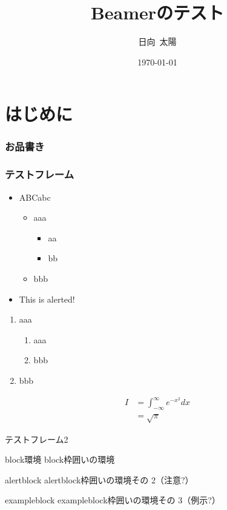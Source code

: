 \documentclass[unicode,11pt,t]{beamer}
\author{日向\ 太陽}
\title{Beamerのテスト}
\institute{日向大学}
\date{\today}
\begin{document}
	\begin{frame}[plain]
		\maketitle
	\end{frame}

	\section{はじめに}
	\begin{frame}
		\frametitle{お品書き}
		\tableofcontents
	\end{frame}

	\begin{frame}
		\frametitle{テストフレーム}
		\begin{itemize}
			\item ABCabc
			\begin{itemize}
				\item aaa
				\begin{itemize}
					\item aa
					\item bb
				\end{itemize}
				\item bbb
			\end{itemize}
			\item \alert{This is alerted!}
		\end{itemize}
		\begin{enumerate}
			\item aaa
			\begin{enumerate}
				\item aaa
				\item bbb
			\end{enumerate}
			\item bbb
		\end{enumerate}
		\begin{align*}
			I &= \int_{-\infty}^{\infty} e^{-x^2} dx \\
			&= \sqrt{\pi}
		\end{align*}
	\end{frame}

	\begin{frame}{テストフレーム2}
		\begin{block}{block環境}
			block枠囲いの環境
		\end{block}
		\begin{alertblock}{alertblock}
			alertblock枠囲いの環境その 2（注意?）
		\end{alertblock}
		\begin{exampleblock}{exampleblock}
			exampleblock枠囲いの環境その 3（例示?）
		\end{exampleblock}
	\end{frame}
\end{document}
